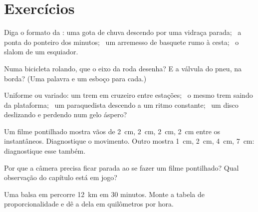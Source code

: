 \section{Exercícios}

\begin{exercise}[$\star$]\label{exo:g6:describing-motion:1}
Diga o formato da : uma gota de chuva descendo por uma
vidraça parada; \ a ponta do ponteiro dos minutos; \ um arremesso de
basquete rumo à cesta; \ o slalom de um esquiador.
\end{exercise}

\begin{exercise}[$\star$]\label{exo:g6:describing-motion:2}
Numa bicicleta rolando, que  o eixo da roda desenha? E a
válvula do pneu, na borda? (Uma palavra e um esboço para cada.)
\end{exercise}

\begin{exercise}[$\star$]\label{exo:g6:describing-motion:3}
Uniforme ou variado: um trem em cruzeiro entre estações; \ o mesmo
trem saindo da plataforma; \ um paraquedista descendo a um ritmo
constante; \ um disco deslizando e perdendo  num gelo
áspero?
\end{exercise}

\begin{exercise}[$\star$]\label{exo:g6:describing-motion:4}
Um filme pontilhado mostra vãos de \qty{2}{cm}, \qty{2}{cm},
\qty{2}{cm}, \qty{2}{cm} entre os instantâneos. Diagnostique o
movimento. Outro mostra \qty{1}{cm}, \qty{2}{cm}, \qty{4}{cm},
\qty{7}{cm}: diagnostique esse também.
\end{exercise}

\begin{exercise}[$\star$]\label{exo:g6:describing-motion:5}
Por que a câmera precisa ficar parada ao se fazer um filme
pontilhado? Qual observação do capítulo está em jogo?
\end{exercise}

\begin{exercise}[$\star$]\label{exo:g6:describing-motion:6}
Uma balsa em  percorre \qty{12}{km} em $30$
minutos. Monte a tabela de proporcionalidade e dê a  dela
em quilômetros por hora.
\end{exercise}

